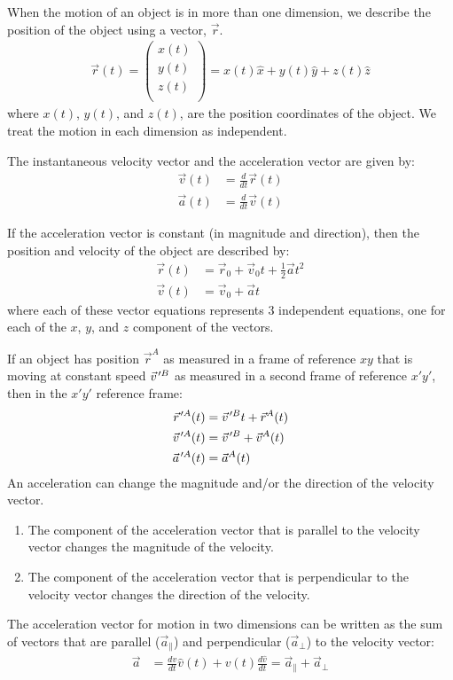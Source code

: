 \begin{chapterSummary}When the motion of an object is in more than one dimension, we describe the position of the object using a vector, $\vec{r}$. 
\begin{align*}
\vec r(t) = \begin{pmatrix}
          x(t) \\
          y(t) \\
          z(t) \\
        \end{pmatrix}= x(t) \hat x + y(t) \hat y + z(t) \hat z
\end{align*}
where $x(t)$, $y(t)$, and $z(t)$, are the position coordinates of the object. We treat the motion in each dimension as independent.

The instantaneous velocity vector and the acceleration vector are given by:
\begin{align*}
\vec v(t) &=\frac{d}{dt}\vec r(t)\\
\vec a(t) &= \frac{d}{dt}\vec v(t)
\end{align*}

If the acceleration vector is constant (in magnitude and direction), then the position and velocity of the object are described by:
\begin{align*}
\vec r(t) &= \vec r_0 + \vec v_0 t + \frac{1}{2} \vec at^2 \\
\vec v(t) &= \vec v_0 + \vec a t
\end{align*}
where each of these vector equations represents 3 independent equations, one for each of the $x$, $y$, and $z$ component of the vectors.

If an object has position $\vec{r}^A$ as measured in a frame of reference $xy$ that is moving at constant speed $\pvec{v}'^B$ as measured in a second frame of reference $x'y'$, then in the $x'y'$ reference frame:
\begin{align*}
\pvec r'^A(t) &= \pvec v'^Bt+\vec r^A(t)\\
\pvec v'^A(t) &=\pvec v'^B+\vec v^A(t)\\
\pvec a'^A(t)&=\vec a^A(t)
\end{align*}
An acceleration can change the magnitude and/or the direction of the velocity vector.
\begin{enumerate}
\item The component of the acceleration vector that is parallel to the velocity vector changes the magnitude of the velocity.
\item The component of the acceleration vector that is perpendicular to the velocity vector changes the direction of the velocity.
\end{enumerate}
The acceleration vector for motion in two dimensions can be written as the sum of vectors that are parallel ($\vec a_{\parallel}$) and perpendicular ($\vec a_{\perp}$) to the velocity vector:
\begin{align*}
\vec a&=\frac{dv}{dt}\hat v(t)+v(t)\frac{d\hat v}{dt} = \vec a_{\parallel} + \vec a_{\perp}
\end{align*}


\end{chapterSummary}
